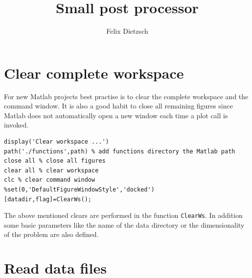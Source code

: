\documentclass[preprint,12pt,ntfdMod]{elsarticle}
\author[rss]{Felix Dietzsch}
\title{Small post processor}
\begin{document}
\maketitle 
\tableofcontents
\maketitle 
\tableofcontents
\maketitle 
\tableofcontents

\section{Clear complete workspace}

\begin{par}
For new Matlab projects best practise is to clear the complete workspace and the command window. It is also a good habit to close all remaining figures since Matlab does not automatically open a new window each time a plot call is invoked.
\end{par} \vspace{1em}
\begin{lstlisting}
display('Clear workspace ...')
path('./functions',path) % add functions directory the Matlab path
close all % close all figures
clear all % clear workspace
clc % clear command window
%set(0,'DefaultFigureWindowStyle','docked')
[datadir,flag]=ClearWs();
\end{lstlisting}
\begin{par}

The above mentioned clears are performed in the function \verb|ClearWs|.
In addition some basic parameters like the name of the data
directory or the dimensionality of the problem are also defined.


\end{par} \vspace{1em}


\section{Read data files}
\end{document}
